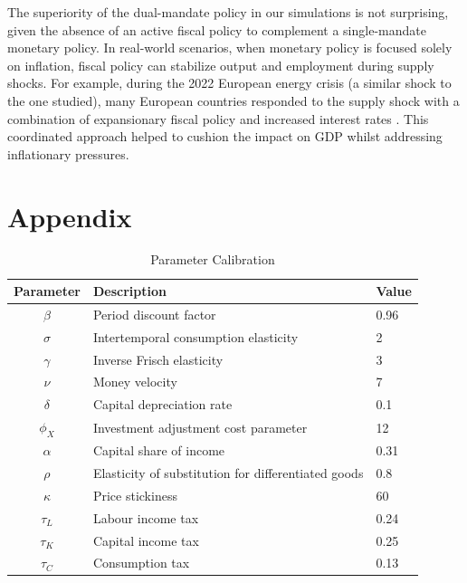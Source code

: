 \documentclass[12pt]{article}
\begin{document}
The superiority of the dual-mandate policy in our simulations is not surprising, given the absence of an active fiscal policy to complement a single-mandate monetary policy. In real-world scenarios, when monetary policy is focused solely on inflation, fiscal policy can stabilize output and employment during supply shocks. For example, during the 2022 European energy crisis (a similar shock to the one studied), many European countries responded to the supply shock with a combination of expansionary fiscal policy and increased interest rates \parencite{bankoffinlandEuropeanCentralBanks2022, checherita-westphalUpdateEuroArea2023}. This coordinated approach helped to cushion the impact on GDP whilst addressing inflationary pressures.
\newpage %
\printbibliography{} %

\newpage
\appendix
\section{Appendix}
\begin{table}[ht]
    \centering
    \caption{Parameter Calibration}\label{tab:parameters}
    \begin{tabular}{cll}
        \toprule
        Parameter & Description & Value  \\ \midrule
        $\beta$ & Period discount factor  & 0.96  \\
        $\sigma$ & Intertemporal consumption elasticity  & 2  \\
        $\gamma$ & Inverse Frisch elasticity  & 3  \\
        $\nu$ & Money velocity  & 7  \\
        $\delta$ & Capital depreciation rate  & 0.1  \\
        $\phi_X$ & Investment adjustment cost parameter & 12  \\
        $\alpha$ & Capital share of income & 0.31  \\
        $\rho$ & Elasticity of substitution for differentiated goods &  0.8  \\
        $\kappa$ & Price stickiness & 60 \\
        ${\tau_L}$ & Labour income tax & 0.24 \\
        ${\tau_K}$ & Capital income tax & 0.25 \\
        ${\tau_C}$ & Consumption tax & 0.13 \\
    \bottomrule
    \end{tabular}
\end{table}
\end{document}

